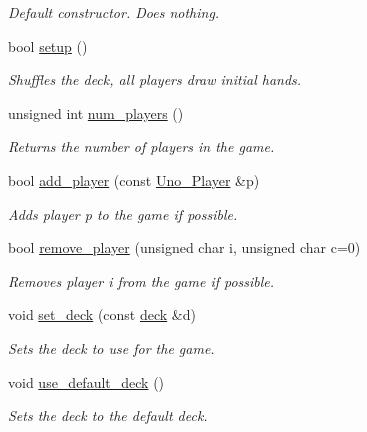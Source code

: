 \begin{DoxyCompactItemize}
\begin{DoxyCompactList}\small\item\em \-Default constructor. \-Does nothing. \end{DoxyCompactList}\item 
bool \hyperlink{class_uno___runner_ae015517f7d4493ddbaaeacd98be0b9b8}{setup} ()
\begin{DoxyCompactList}\small\item\em \-Shuffles the deck, all players draw initial hands. \end{DoxyCompactList}\item 
unsigned int \hyperlink{class_uno___runner_aa3f43b6ab9042ff74a34ad3fae8a0b11}{num\-\_\-players} ()
\begin{DoxyCompactList}\small\item\em \-Returns the number of players in the game. \end{DoxyCompactList}\item 
bool \hyperlink{class_uno___runner_a982f614c5afa8faa57aedc3116f3d237}{add\-\_\-player} (const \hyperlink{class_uno___player}{\-Uno\-\_\-\-Player} \&p)
\begin{DoxyCompactList}\small\item\em \-Adds player p to the game if possible. \end{DoxyCompactList}\item 
bool \hyperlink{class_uno___runner_acae1277934b338e4c6edd8d45eea5a3e}{remove\-\_\-player} (unsigned char i, unsigned char c=0)
\begin{DoxyCompactList}\small\item\em \-Removes player i from the game if possible. \end{DoxyCompactList}\item 
void \hyperlink{class_uno___runner_a2ca7c819e3fc8774853cc5a49333eeb9}{set\-\_\-deck} (const \hyperlink{uno__deck_8h_ab634a15f4d19d3af113a71241b79c408}{deck} \&d)
\begin{DoxyCompactList}\small\item\em \-Sets the deck to use for the game. \end{DoxyCompactList}\item 
void \hyperlink{class_uno___runner_aecbd83efd47580d89f7ef9b030572c74}{use\-\_\-default\-\_\-deck} ()
\begin{DoxyCompactList}\small\item\em \-Sets the deck to the default deck. \end{DoxyCompactList}\item 

\end{DoxyCompactItemize}
